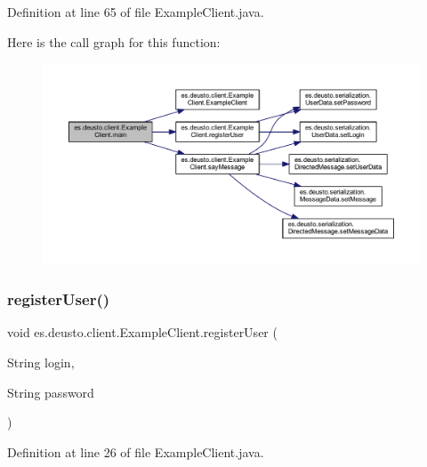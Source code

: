 Definition at line 65 of file Example\+Client.\+java.

Here is the call graph for this function\+:
\nopagebreak
\begin{figure}[H]
\begin{center}
\leavevmode
\includegraphics[width=350pt]{classes_1_1deusto_1_1client_1_1_example_client_a9eadbc017db92b83cad1f6b72c10bae2_cgraph}
\end{center}
\end{figure}
\mbox{\label{classes_1_1deusto_1_1client_1_1_example_client_afcc2d4b74c1768d39359f6e4a7a96f17}} 
\subsubsection{\texorpdfstring{registerUser()}{registerUser()}}
{\footnotesize\ttfamily void es.\+deusto.\+client.\+Example\+Client.\+register\+User (\begin{DoxyParamCaption}\item[{String}]{login,  }\item[{String}]{password }\end{DoxyParamCaption})}



Definition at line 26 of file Example\+Client.\+java.

